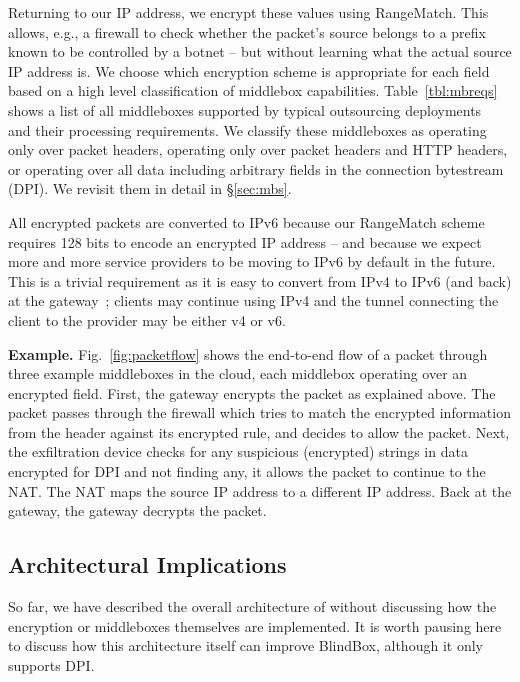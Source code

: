 Returning to our IP address, we encrypt these values using RangeMatch. This allows, e.g., a firewall to check whether the packet's source belongs to a prefix known to be controlled by a botnet -- but without learning what the actual source IP address is.
We choose which encryption scheme is appropriate for each field based on a high level classification of middlebox capabilities.
Table~\ref{tbl:mbreqs} shows a list of all middleboxes supported by typical outsourcing deployments~\cite{aplomb} and their processing requirements.
We classify these middleboxes as operating only over packet headers, operating only over packet headers and HTTP headers, or operating over all data including arbitrary fields in the connection bytestream (DPI).
We revisit them in detail in \S\ref{sec:mbs}.

All encrypted packets are converted to IPv6 because our RangeMatch scheme requires 128 bits to encode an encrypted IP address -- and because we expect more and more service providers to be moving to IPv6 by default in the future.
This is a trivial requirement as it is easy to convert from IPv4 to IPv6 (and back) at the gateway~\cite{siit}; clients may continue using IPv4 and the tunnel connecting the client to the provider may be either v4 or v6.

{\bf Example.} Fig.~\ref{fig:packetflow} shows the end-to-end flow of a packet through three example middleboxes in the cloud, each middlebox operating over an encrypted field.  
First,  the gateway encrypts the packet as explained above. The packet passes through the firewall which tries to match the encrypted information from the header against its encrypted rule, and decides to allow the packet. Next, the exfiltration device checks for any suspicious (encrypted) strings in data encrypted for DPI and not finding any, it allows the packet  to continue to the NAT. The NAT maps the source IP address to a different IP address. Back at the gateway, the gateway decrypts the packet. 

\subsection{Architectural Implications}
\label{sec:bbarch}
So far, we have described the overall architecture of \sys without discussing how the encryption or middleboxes themselves are implemented.
It is worth pausing here to discuss how this architecture itself can improve BlindBox, although it only supports DPI.

